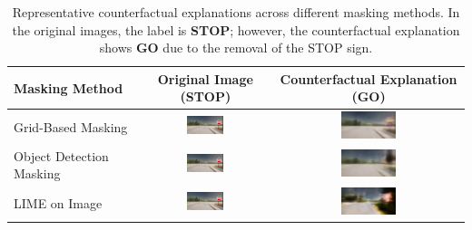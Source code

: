 \begin{table}[htbp]
    \centering
    \caption{Representative counterfactual explanations across different masking methods. In the original images, the label is \textbf{STOP}; however, the counterfactual explanation shows \textbf{GO} due to the removal of the STOP sign.}
    \label{tab:cf_visual_examples}
    \begin{tabular}{>{\centering\arraybackslash}p{3.5cm} >{\centering\arraybackslash}c >{\centering\arraybackslash}c}
        \toprule
        \textbf{Masking Method} & \textbf{Original Image (STOP)} & \textbf{Counterfactual Explanation (GO)} \\
        \midrule
        Grid-Based Masking & 
        \includegraphics[width=0.3\textwidth]{img/masking_results/original.png} & 
        \includegraphics[width=0.3\textwidth]{img/masking_results/grid_cf.png} \\
        \addlinespace
        Object Detection Masking & 
        \includegraphics[width=0.3\textwidth]{img/masking_results/original.png} & 
        \includegraphics[width=0.3\textwidth]{img/masking_results/object_detection_cf.png} \\
        \addlinespace
        LIME on Image & 
        \includegraphics[width=0.3\textwidth]{img/masking_results/original.png} & 
        \includegraphics[width=0.3\textwidth]{img/masking_results/lime_image_cf.png} \\

\end{tabular}
\end{table}
